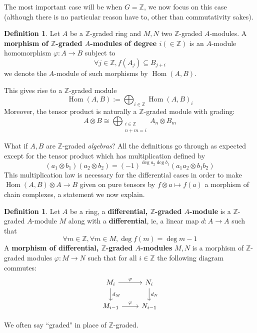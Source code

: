 \documentclass[12pt]{article}
\theoremstyle{plain}
\theoremstyle{definition}
\newtheorem{defn}[thm]{Definition} %
\newcommand{\bb}[1]{\mathbb{#1}}
\newcommand{\lto}{\longrightarrow}
\begin{document}
The most important case will be when $G = \bb{Z}$, we now focus on this case (although there is no particular reason have to, other than commutativity sakes).
\begin{defn}\label{def:hom_tens_grading}
	Let $A$ be a $\bb{Z}$-graded ring and $M,N$ two $\bb{Z}$-graded $A$-modules. A \textbf{morphism of $\bb{Z}$-graded $A$-modules of degree $i (\in \bb{Z})$} is an $A$-module homomorphism $\varphi: A \lto B$ subject to
	\begin{equation}
		\forall j \in \bb{Z}, f(A_j) \subseteq B_{j + i}
	\end{equation}
	we denote the $A$-module of such morphisms by $\operatorname{Hom}(A,B)$.
	
	This gives rise to a $\bb{Z}$-graded module
	\begin{equation}
		\operatorname{Hom}(A,B) := \bigoplus_{i \in \bb{Z}}\operatorname{Hom}(A,B)_i
	\end{equation}
	Moreover, the tensor product is naturally a $\bb{Z}$-graded module with grading:
	\begin{equation}
		A \otimes B \cong \bigoplus_{\substack{i \in \bb{Z}\\ n + m = i}}A_n \otimes B_m
	\end{equation}
\end{defn}
What if $A,B$ are $\bb{Z}$-graded \emph{algebras}? All the definitions go through as expected except for the tensor product which has multiplication defined by
\begin{equation}\label{eq:tensor}
	(a_1 \otimes b_1)(a_2 \otimes b_2) = (-1)^{\operatorname{deg}a_2\operatorname{deg}b_1}(a_1a_2 \otimes b_1b_2)
\end{equation}
This multiplication law is necessary for the differential cases in order to make $\operatorname{Hom}(A,B) \otimes A \lto B$ given on pure tensors by $f \otimes a \longmapsto f(a)$ a morphism of chain complexes, a statement we now explain.
\begin{defn}\label{def:diff_graded}
	Let $A$ be a ring, a \textbf{differential, $\bb{Z}$-graded $A$-module} is a $\bb{Z}$-graded $A$-module $M$ along with a \textbf{differential}, ie, a linear map $d: A \lto A$ such that
	\begin{equation}
		\forall m \in \bb{Z}, \forall m \in M, \operatorname{deg}f(m) = \operatorname{deg}m - 1
	\end{equation}
	A \textbf{morphism of differential, $\bb{Z}$-graded $A$-modules} $M,N$ is a morphism of $\bb{Z}$-graded modules $\varphi: M \lto N$ such that for all $i \in \bb{Z}$
	the following diagram commutes:
	\begin{equation}
		\begin{tikzcd}
			M_i\arrow[r, "\varphi"]\arrow[d,"{d_M}"] & N_i\arrow[d,"{d_N}"]\\
			M_{i - 1}\arrow[r,"{\varphi}"] & N_{i - 1}
		\end{tikzcd}
	\end{equation}
\end{defn}
We often say ``graded" in place of $\bb{Z}$-graded.
\end{document}
